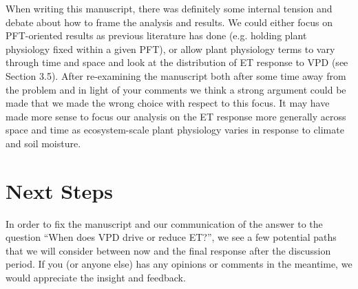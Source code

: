When writing this manuscript, there was definitely some internal
tension and debate about how to frame the analysis and results. We
could either focus on PFT-oriented results as previous literature has
done (e.g. holding plant physiology fixed within a given PFT), or
allow plant physiology terms to vary through time and space and look
at the distribution of ET response to VPD (see Section 3.5). After
re-examining the manuscript both after some time away from the
problem and in light of your comments we think a strong argument could
be made that we made the wrong choice with respect to this focus. It
may have made more sense to focus our analysis on the ET response more
generally across space and time as ecosystem-scale plant physiology
varies in response to climate and soil moisture.

\section{Next Steps}

In order to fix the manuscript and our communication of the answer to
the question ``When does VPD drive or reduce ET?'', we see a few
potential paths that we will consider between now and the final
response after the discussion period. If you (or anyone else) has any
opinions or comments in the meantime, we would appreciate the insight
and feedback.

